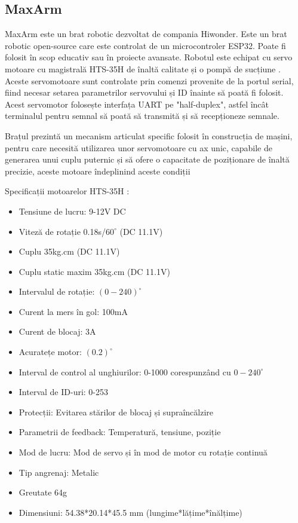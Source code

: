 \subsection{MaxArm}

MaxArm este un brat robotic dezvoltat de compania Hiwonder. Este un brat robotic open-source care este controlat de un microcontroler ESP32. Poate fi folosit în scop educativ sau în proiecte avansate. Robotul este echipat cu servo motoare cu magistrală HTS-35H de înaltă calitate și o pompă de sucțiune \cite{MaxArm}. 
Aceste servomotoare sunt controlate prin comenzi provenite de la portul serial, fiind necesar setarea parametrilor servovului și ID înainte să poată fi folosit. Acest servomotor folosește interfața UART pe "half-duplex", astfel încât terminalul pentru semnal să poată să transmită și să recepționeze semnale. 

Brațul prezintă un mecanism articulat specific folosit în construcția de mașini, pentru care necesită utilizarea unor servomotoare cu ax unic, capabile de generarea unui cuplu puternic și să ofere o capacitate de poziționare de înaltă precizie, aceste motoare îndeplinind aceste condiții \cite{MaxArmServo}

Specificații motoarelor HTS-35H \cite{MaxArmServo}:
\begin{itemize}
	\item Tensiune de lucru: 9-12V DC
	\item Viteză de rotație 0.18s/$60^{\circ}$ (DC 11.1V)
	\item Cuplu 35kg.cm (DC 11.1V)
	\item Cuplu static maxim 35kg.cm (DC 11.1V)
	\item Intervalul de rotație: $(0-240)^{\circ}$
	\item Curent la mers în gol: 100mA
	\item Curent de blocaj: 3A
	\item Acuratețe motor:  $(0.2)^{\circ}$
	\item Interval de control al unghiurilor: 0-1000 corespunzând cu $0-240^{\circ}$
	\item Interval de ID-uri: 0-253
	\item Protecții: Evitarea stărilor de blocaj și supraîncălzire
	\item Parametrii de feedback: Temperatură, tensiune, poziție
	\item Mod de lucru: Mod de servo și în mod de motor cu rotație continuă
	\item Tip angrenaj: Metalic
	\item Greutate 64g
	\item Dimensiuni: 54.38*20.14*45.5 mm (lungime*lățime*înălțime)
\end{itemize}


